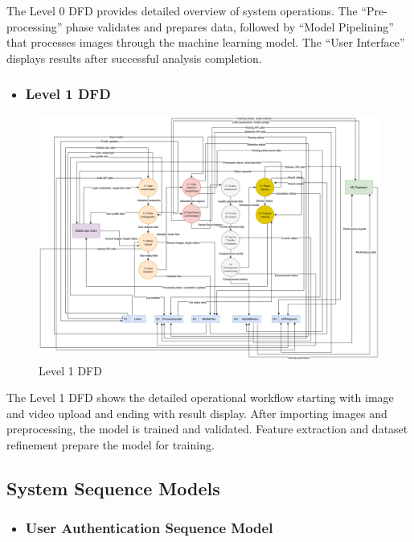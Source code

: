 \documentclass[12pt,a4paper]{report}
\begin{document}
The Level 0 DFD provides detailed overview of system operations. The ``Pre-processing'' phase validates and prepares data, followed by ``Model Pipelining'' that processes images through the machine learning model. The ``User Interface'' displays results after successful analysis completion.
\begin{landscape}
\begin{itemize}
    \item \subsubsection{Level 1 DFD}
\end{itemize}

\begin{figure}[H]
\centering
\includegraphics[width=1.1\textwidth]{figures/level_1_dfd.png}
\caption{Level 1 DFD}
\label{fig:level1_dfd}
\end{figure}
\end{landscape}


The Level 1 DFD shows the detailed operational workflow starting with image and video upload and ending with result display. After importing images and preprocessing, the model is trained and validated. Feature extraction and dataset refinement prepare the model for training.

\subsection{System Sequence Models}

\begin{itemize}
    \item \subsubsection{User Authentication Sequence Model}
\end{itemize}
\end{document}
